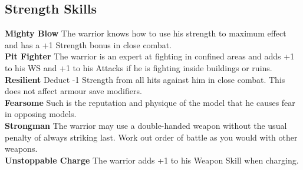 \subsection*{Strength Skills}
\textbf{Mighty Blow} The warrior knows how to use his strength to maximum effect and has a +1 Strength bonus in close combat. \\ 
\textbf{Pit Fighter} The warrior is an expert at fighting in confined areas and adds +1 to his WS and +1 to his Attacks if he is fighting inside buildings or ruins. \\ 
\textbf{Resilient} Deduct -1 Strength from all hits against him in close combat. This does not affect armour save modifiers. \\ 
\textbf{Fearsome} Such is the reputation and physique of the model that he causes fear in opposing models. \\ 
\textbf{Strongman} The warrior may use a double-handed weapon without the usual penalty of always striking last. Work out order of battle as you would with other weapons. \\ 
\textbf{Unstoppable Charge} The warrior adds +1 to his Weapon Skill when charging.
